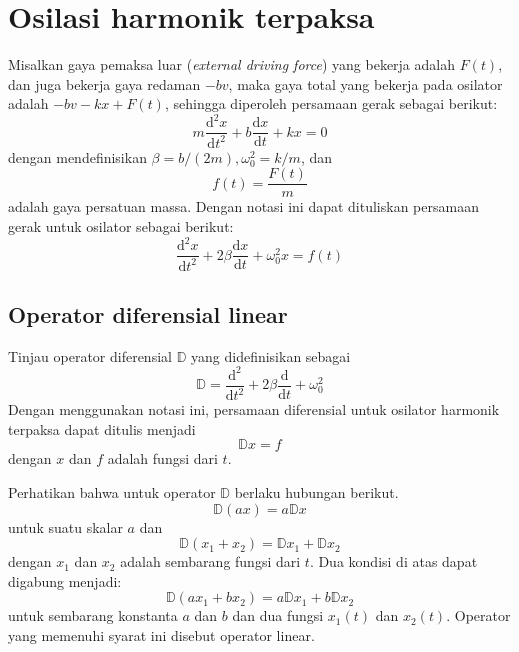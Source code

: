 \section{Osilasi harmonik terpaksa}

Misalkan gaya pemaksa luar (\textit{external driving force}) yang bekerja adalah
$F(t)$, dan juga bekerja gaya redaman $-bv$, maka gaya total yang
bekerja pada osilator adalah $-bv-kx+F(t)$, sehingga diperoleh persamaan
gerak sebagai berikut:
\[
m\frac{\mathrm{d}^{2}x}{\mathrm{d}t^{2}}+b\frac{\mathrm{d}x}{\mathrm{d}t}+kx=0
\]
dengan mendefinisikan $\beta=b/(2m),$$\omega_{0}^{2}=k/m$, dan
\[
f(t)=\frac{F(t)}{m}
\]
adalah gaya persatuan massa. Dengan notasi ini dapat dituliskan persamaan
gerak untuk osilator sebagai berikut:
\[
\frac{\mathrm{d}^{2}x}{\mathrm{d}t^{2}}+2\beta\frac{\mathrm{d}x}{\mathrm{d}t}+\omega_{0}^{2}x=f(t)
\]

\subsection{Operator diferensial linear}

Tinjau operator diferensial $\mathbb{D}$ yang didefinisikan sebagai
\begin{equation}
\mathbb{D}=\frac{\mathrm{d}^{2}}{\mathrm{d}t^{2}}+2\beta\frac{\mathrm{d}}{\mathrm{d}t}+\omega_{0}^{2}
\end{equation}
Dengan menggunakan notasi ini, persamaan diferensial untuk osilator
harmonik terpaksa dapat ditulis menjadi
\begin{equation*}
\mathbb{D}x=f
\end{equation*}
dengan $x$ dan $f$ adalah fungsi dari $t$.

Perhatikan bahwa untuk operator $\mathbb{D}$
berlaku hubungan berikut.
\begin{equation*}
\mathbb{D}(ax) = a\mathbb{D}x
\end{equation*}
untuk suatu skalar $a$ dan
\begin{equation*}
\mathbb{D}(x_{1} + x_{2}) = \mathbb{D}x_{1} + \mathbb{D}x_{2}
\end{equation*}
dengan $x_{1}$ dan $x_{2}$ adalah sembarang fungsi dari $t$.
Dua kondisi di atas dapat digabung menjadi:
\begin{equation*}
\mathbb{D}(ax_{1} + bx_{2})=a\mathbb{D}x_{1}+b\mathbb{D}x_{2}
\end{equation*}
untuk sembarang konstanta $a$ dan $b$ dan dua fungsi $x_{1}(t)$
dan $x_{2}(t)$. Operator yang memenuhi syarat ini disebut
operator linear.

